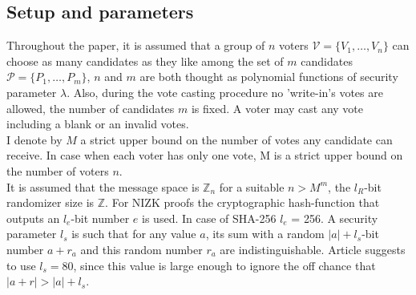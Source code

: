\subsection{Setup and parameters}
Throughout the paper, it is assumed that a group of $n$ voters $\mathcal{V} = \{V_1,\dots,V_n\}$ can choose as many candidates as they like among the set of $m$ candidates $\mathcal{P} = \{P_1,\dots,P_m\}$, $n$ and $m$ are both thought as polynomial functions of security parameter $\lambda$. Also, during the vote casting procedure no 'write-in's votes are allowed, the number of candidates $m$ is fixed. A voter may cast any vote including a blank or an invalid votes. \\

I denote by $M$ a strict upper bound on the number of votes any candidate can receive. In case when each voter has only one vote, M is a strict upper bound on the number of voters $n$.\\ 

It is assumed that the message space is $\mathbb{Z}_n$ for a suitable $n > M^m$, the $l_R$-bit randomizer size is  $\mathbb{Z}$. For NIZK proofs the cryptographic hash-function that outputs an $l_e$-bit number $e$ is used. In case of SHA-256  $l_e$ = 256. A security parameter $l_s$ is such that for any value $a$, its sum with a random $|a| + l_s$-bit number $a + r_a$ and this random number $r_a$ are indistinguishable. Article \cite{Groth2005} suggests to use $l_s = 80$, since this value is large enough to ignore the off chance that $|a+r| > |a|+l_s$.

